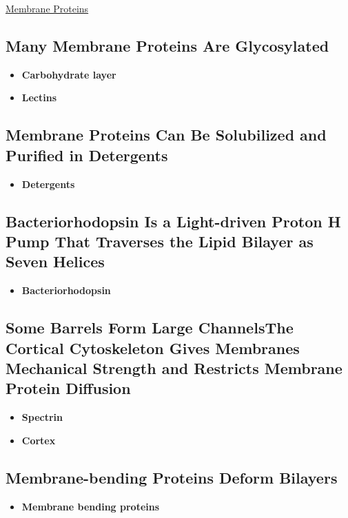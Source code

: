 \documentclass[12pt,letterpaper]{article}
\begin{document}
\begin{secbox}{\hyperlink{10}{Membrane Proteins}}
{    \subsection*{Many Membrane Proteins Are Glycosylated}
    \begin{itemize}
        \item \textbf{Carbohydrate layer}
        \item \textbf{Lectins}
    \end{itemize}

    \subsection*{Membrane Proteins Can Be Solubilized and Purified in Detergents}
    \begin{itemize}
        \item \textbf{Detergents}
    \end{itemize}

    \subsection*{Bacteriorhodopsin Is a Light-driven Proton H\bfg{^+} Pump That
    Traverses the Lipid Bilayer as Seven \bfg{\alpha} Helices}
    \begin{itemize}
        \item \textbf{Bacteriorhodopsin}
    \end{itemize}

    \subsection*{Some \bfg{\beta} Barrels Form Large ChannelsThe Cortical Cytoskeleton Gives Membranes Mechanical Strength and Restricts Membrane Protein Diffusion}
    \begin{itemize}
        \item \textbf{Spectrin}
        \item \textbf{Cortex}
    \end{itemize}

    \subsection*{Membrane-bending Proteins Deform Bilayers}
    \begin{itemize}
        \item \textbf{Membrane bending proteins}
    \end{itemize}
}\end{secbox}
\end{document}
